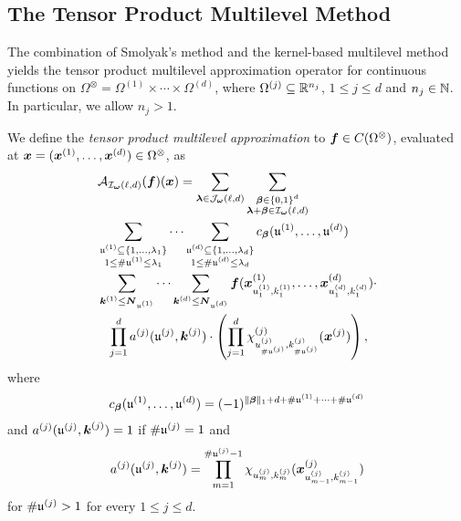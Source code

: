 \documentclass[	a4paper, 
								11pt]{article}
\theoremstyle{plain}
\begin{document}
\subsection{The Tensor Product Multilevel Method}

The combination of Smolyak's method and the kernel-based multilevel method yields the tensor product multilevel approximation operator for continuous functions on $ \Omega^{\otimes} = \Omega^{(1)} \times \cdots \times \Omega^{(d)}$, where $ \Omega^{(j)} \subseteq \mathbb{R}^{n_j} $, $ 1 \leq j \leq d $ and $ n_j \in \mathbb{N} $. In particular, we allow $ n_j > 1 $.

\begin{definition}\label{def:TPMLGeneralRepresentation}
 We define the \emph{tensor product multilevel approximation} to $ \boldsymbol{f} \in C(\Omega^{\otimes}) $, 
 evaluated at $ \boldsymbol{x} = ( \boldsymbol{x}^{(1)}, \dots, \boldsymbol{x}^{(d)}) \in \Omega^{\otimes} $, as 
   \begin{align}\label{eq:TPMLGeneralRepresentation}
 \begin{aligned}
  &\mathcal{A}_{\mathcal{I}_{\boldsymbol{\omega}}(\ell,d)}(\boldsymbol{f})(\boldsymbol{x}) = 
  \sum_{\boldsymbol{\lambda} \in \mathcal{J}_{\boldsymbol{\omega}}(\ell,d)} \sum_
  {\substack{\boldsymbol{\beta} \in \{0,1\}^d \\ \boldsymbol{\lambda} + \boldsymbol{\beta} \in \mathcal{I}_{\boldsymbol{\omega}}
  (\ell,d)}} \\
  &\sum_{\substack{\mathfrak{u}^{(1)} \subseteq \{1, \dots, \lambda_1\} \\ 1 \leq \# 
  \mathfrak{u}^{(1)} \leq \lambda_1}} \cdots \sum_{\substack{\mathfrak{u}^{(d)} \subseteq 
  \{1, \dots, \lambda_d\} \\ 1 \leq \# \mathfrak{u}^{(d)} \leq \lambda_d}} 
  c_{\boldsymbol{\beta}}( \mathfrak{u}^{(1)}, \dots, \mathfrak{u}^{(d)}) \\ 
  &\sum_{\boldsymbol{k}^{(1)} \leq 
  \boldsymbol{N}_{\mathfrak{u}^{(1)}}} \cdots \sum_{\boldsymbol{k}^{(d)} \leq \boldsymbol{N}_{\mathfrak{u}^{(d)}}} 
  \boldsymbol{f}(\boldsymbol{x}^{(1)}_{u_1^{(1)},k^{(1)}_1}, \dots, \boldsymbol{x}^{(d)}_{u_1^{(d)},k^{(d)}_1}) 
  \cdot \\ 
  &\phantom{=} \prod_{j=1}^{d} a^{(j)}(\mathfrak{u}^{(j)},\boldsymbol{k}^{(j)})
  \cdot 
  \left( \prod_{j=1}^{d} \chi^{(j)}_{u^{(j)}_{\# \mathfrak{u}^{(j)}},k^{(j)}_
  {\# \mathfrak{u}^{(j)}}} (\boldsymbol{x}^{(j)}) \right),
    \end{aligned}
 \end{align}
 where 
 \begin{align*}
  c_{\boldsymbol{\beta}}( \mathfrak{u}^{(1)}, \dots, \mathfrak{u}^{(d)}) = (-1)^{\| \boldsymbol{\beta} \|_1 + d +
  \# \mathfrak{u}^{(1)} + \cdots + \# \mathfrak{u}^{(d)}}
 \end{align*}
and $ a^{(j)}(\mathfrak{u}^{(j)}, \boldsymbol{k}^{(j)}) = 1 $ if $ \# \mathfrak{u}^{(j)} = 1 $ and 
\begin{align}\label{eq:combinedOperatorCoefficient}
a^{(j)}(\mathfrak{u}^{(j)}, \boldsymbol{k}^{(j)}) = \prod_{m = 1}^{\# \mathfrak{u}^{(j)} - 1} 
\chi_{u^{(j)}_m,k^{(j)}_m} (\boldsymbol{x}^{(j)}_{u^{(j)}_{m-1}, k^{(j)}_{m-1}}) 
\end{align}
for $ \#\mathfrak{u}^{(j)} > 1 $ for every $ 1 \leq j \leq d $.
\end{definition}
\end{document}
